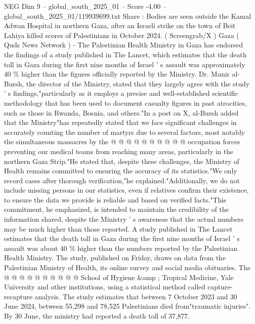 \begin{textsample}{NEG Dim 9 – global\_south\_2025\_01 – Score -4.00 – global\_south\_2025\_01/119939699.txt}  \label{ex:f9_neg_110}
Share : Bodies are seen outside the Kamal Adwan Hospital in northern Gaza, after an Israeli strike on the town of Beit Lahiya killed scores of Palestinians in October 2024. ( Screengrab/X ) Gaza ( Quds News Network ) - The Palestinian Health Ministry in Gaza has endorsed the findings of a study published in The Lancet, which estimates that the death toll in Gaza during the first nine months of Israel ' s assault was approximately 40 \% higher than the figures officially reported by the Ministry.
Dr.
Munir al-Bursh, the director of the Ministry, stated that they largely agree with the study ' s findings,"particularly as it employs a precise and well-established scientific methodology that has been used to document casualty figures in past atrocities, such as those in Rwanda, Bosnia, and others."In a post on X, al-Bursh added that the Ministry"has repeatedly stated that we face significant challenges in accurately counting the number of martyrs due to several factors, most notably the simultaneous massacres by the @ @ @ @ @ @ @ @ @ @ occupation forces preventing our medical teams from reaching many areas, particularly in the northern Gaza Strip."He stated that, despite these challenges, the Ministry of Health remains committed to ensuring the accuracy of its statistics."We only record cases after thorough verification,"he explained."Additionally, we do not include missing persons in our statistics, even if relatives confirm their existence, to ensure the data we provide is reliable and based on verified facts."This commitment, he emphasized, is intended to maintain the credibility of the information shared, despite the Ministry ' s awareness that the actual numbers may be much higher than those reported.
A study published in The Lancet estimates that the death toll in Gaza during the first nine months of Israel ' s assault was about 40 \% higher than the numbers reported by the Palestinian Health Ministry.
The study, published on Friday, draws on data from the Palestinian Ministry of Health, its online survey and social media obituaries.
The @ @ @ @ @ @ @ @ @ @ School of Hygiene \&amp ; Tropical Medicine, Yale University and other institutions, using a statistical method called capture-recapture analysis.
The study estimates that between 7 October 2023 and 30 June 2024, between 55,298 and 78,525 Palestinians died from"traumatic injuries".
By 30 June, the ministry had reported a death toll of 37,877.

\end{textsample}
